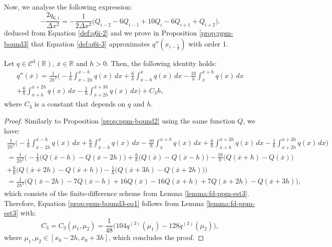 Now, we analyse the following expression:
\begin{equation}
	\label{def:q6i-3}
	-\frac{2q_{6,i}}{\Delta x^2} = 
	-\frac{1}{2\Delta x^2} \bigg( Q_{i-2} - 6Q_{i-1} + 10Q_{i} -6Q_{i+1}  + Q_{i+2} \bigg).
\end{equation}
deduced from Equation \eqref{def:q6i-2}
and we prove in Proposition \ref{prop:ppm-bound3} that Equation \eqref{def:q6i-3}
approximates $q''(x_{i-\frac{1}{2}})$ with order 1.
\begin{prop}
	\label{prop:ppm-bound3}
	Let $q \in \mathcal{C}^{3}(\mathbb{R})$, $\overline{x} \in \mathbb{R}$ and $h>0$.
	Then, the following identity holds:
	\begin{equation}
		\begin{split}
		\label{prop:ppm-bound3-eq1}
		q''(\overline{x} ) = \frac{1}{2h^2}
		\bigg(-\frac{1}{h} \int_{\overline{x}-2h}^{\overline{x}-h} q(x) \,dx 
		      +\frac{6}{h}\int_{\overline{x}-h}^{\overline{x}} q(x) \,dx   
		      -\frac{10}{h}\int_{\overline{x}}^{\overline{x}+h} q(x) \,dx  \\ 
		      +\frac{6}{h} \int_{\overline{x}+h}^{\overline{x}+2h} q(x) \,dx   
		      -\frac{1}{h} \int_{\overline{x}+2h}^{\overline{x}+3h} q(x) \,dx   
		\bigg) + C_3h,
		\end{split}
	\end{equation}
	where $C_3$ is a constant that depends on $q$ and $h$.
\end{prop}
\begin{proof}
	Similarly to Proposition \ref{prop:ppm-bound2} using the same function $Q$, we have:
	\begin{align*}
	\frac{1}{2h^2}
		\bigg(-\frac{1}{h} \int_{\overline{x}-2h}^{\overline{x}-h} q(x) \,dx 
		      +\frac{6}{h}\int_{\overline{x}-h}^{\overline{x}} q(x) \,dx   
		      -\frac{10}{h}\int_{\overline{x}}^{\overline{x}+h} q(x) \,dx  
		      +\frac{6}{h} \int_{\overline{x}+h}^{\overline{x}+2h} q(x) \,dx   
		      -\frac{1}{h} \int_{\overline{x}+2h}^{\overline{x}+3h} q(x) \,dx   
		\bigg)\\ 
		= \frac{1}{2h^2} \bigg(
		-\frac{1}{h}   \big( Q(\overline{x}-h)- Q(\overline{x}-2h)\big) 
		+\frac{6}{h} \big( Q(\overline{x}) - Q(\overline{x}-h) \big) 
		-\frac{10}{h} \big( Q(\overline{x}+h) - Q(\overline{x})  \big) \\
		+\frac{6}{h}  \big( Q(\overline{x}+2h) - Q(\overline{x}+h)  \big) 
		-\frac{1}{h}  \big( Q(\overline{x}+3h) - Q(\overline{x}+2h)  \big) 
		\bigg)\\
		= \frac{1}{2h^3}\bigg(Q(\overline{x}-2h) - 7Q(\overline{x}-h) + 16Q(\overline{x}) 
		-16Q(\overline{x}+h) +7Q(\overline{x}+2h) - Q(\overline{x}+3h)  \bigg),
	\end{align*}
	which consists of the finite-difference scheme from Lemma \ref{lemma:fd-ppm-est3}. 
	Therefore, Equation \eqref{prop:ppm-bound3-eq1} follows from 
	Lemma \ref{lemma:fd-ppm-est3} with:
	\begin{equation}
		\label{prop:ppm-bound3-eq2}
		C_3 = C_3(\mu_1,\mu_{2}) = \frac{1}{48}\bigg(104q^{(3)}(\mu_{1}) - 128q^{(3)}(\mu_{2}) \bigg), 
	\end{equation}
	where $\mu_{1}, \mu_{2} \in [x_0-2h,x_0+3h]$, which concludes the proof.
\end{proof}
